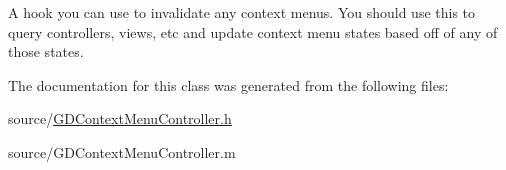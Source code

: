 A hook you can use to invalidate any context menus. You should use this to query controllers, views, etc and update context menu states based off of any of those states. 

The documentation for this class was generated from the following files:\begin{DoxyCompactItemize}
\item 
source/\hyperlink{_g_d_context_menu_controller_8h}{GDContextMenuController.h}\item 
source/GDContextMenuController.m\end{DoxyCompactItemize}
